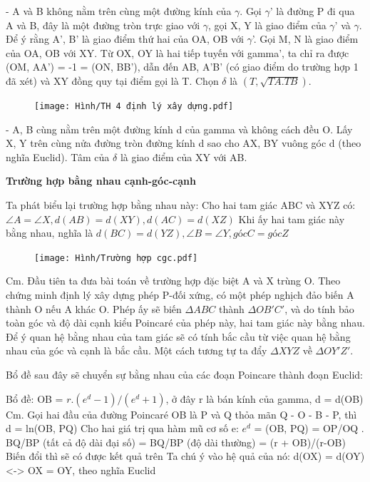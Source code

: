 \begin{multicols}{2}
	- A và B không nằm trên cùng một đường kính của $\gamma$. Gọi $\gamma$' là đường P đi qua A và B, đây là một đường tròn trực giao với $\gamma$, gọi X, Y là giao điểm của $\gamma$' và $\gamma$. Để ý rằng A', B' là giao điểm thứ hai của OA, OB với $\gamma$'. Gọi M, N là giao điểm của OA, OB với XY. Từ OX, OY là hai tiếp tuyến với gamma', ta chỉ ra được (OM, AA') = -1 = (ON, BB'), dẫn đến AB, A'B' (có giao điểm do trường hợp 1 đã xét) và XY đồng quy tại điểm gọi là T. Chọn $\delta$ là $(T, \sqrt{TA.TB})$. \\
	
	\begin{figure}[ht]
		\texttt{[image: Hình/TH 4 định lý xây dựng.pdf]}
	\end{figure}
	
	- A, B cùng nằm trên một đường kính d của gamma và không cách đều O. Lấy X, Y trên cùng nửa đường tròn đường kính d sao cho AX, BY vuông góc d (theo nghĩa Euclid). Tâm của $\delta$ là giao điểm của XY với AB.
	
	\textbf{\color{lichsutoanhoc}Trường hợp bằng nhau cạnh-góc-cạnh}
	
	Ta phát biểu lại trường hợp bằng nhau này:
	Cho hai tam giác ABC và XYZ có: $ \angle A = \angle X, d(AB) = d(XY), d(AC) = d(XZ)$
	Khi ấy hai tam giác này bằng nhau, nghĩa là $d(BC)  = d(YZ), \angle B = \angle Y, góc C = góc Z$
	
	\begin{figure}[ht]
		\texttt{[image: Hình/Trường hợp cgc.pdf]}
	\end{figure}
	
	
	Cm. Đầu tiên ta đưa bài toán về trường hợp đặc biệt A và X trùng O.
	Theo chứng minh định lý xây dựng phép P-đối xứng, có một phép nghịch đảo biến A thành O nếu A khác O. Phép ấy sẽ biến $\Delta ABC$ thành $\Delta OB'C'$, và do tính bảo toàn góc và độ dài cạnh kiểu Poincaré của phép này, hai tam giác này bằng nhau. Để ý quan hệ bằng nhau của tam giác sẽ có tính bắc cầu từ việc quan hệ bằng nhau của góc và cạnh là bắc cầu. Một cách tương tự ta đẩy $\Delta XYZ$ về $ \Delta OY'Z'$.
	
	Bổ đề sau đây sẽ chuyển sự bằng nhau của các đoạn Poincare thành đoạn Euclid:
	
	Bổ đề: OB = $r.(e^d -1)/(e^d+1)$, ở đây r là bán kính của gamma, d = d(OB)
	Cm. Gọi hai đầu của đường Poincaré OB là P và Q thỏa mãn Q - O - B - P, thì d = ln(OB, PQ)
	Cho hai giá trị qua hàm mũ cơ số e:
	$e^d$ = (OB, PQ) = OP/OQ . BQ/BP (tất cả độ dài đại số) = BQ/BP (độ dài thường) = (r + OB)/(r-OB)
	Biến đổi thì sẽ có được kết quả trên
	Ta chú ý vào hệ quả của nó: d(OX) = d(OY) <-> OX = OY, theo nghĩa Euclid
	

\end{multicols}
